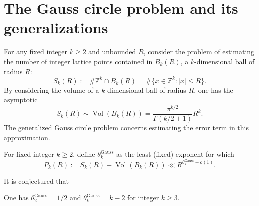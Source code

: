 \chapter{The Gauss circle problem and its generalizations}\label{gauss-circle-chapter}

\unintegrated

For any fixed integer $k \ge 2$ and unbounded $R$, consider the problem of estimating the number of integer lattice points contained in $B_k(R)$, a $k$-dimensional ball of radius $R$:
\[
S_k(R) := \# \mathbb{Z}^k \cap B_k(R) = \# \{x \in \mathbb{Z}^k: |x| \le R\}.
\]
By considering the volume of a $k$-dimensional ball of radius $R$, one has the asymptotic
\[
S_k(R) \sim \operatorname{Vol}(B_k(R)) = \frac{\pi^{k/2}}{\Gamma(k/2 + 1)}R^k.
\]
The generalized Gauss circle problem concerns estimating the error term in this approximation.

\begin{definition}
For fixed integer $k \ge 2$, define $\theta^{\operatorname{Gauss}}_{k}$ as the least (fixed) exponent for which
\[
P_k(R) := S_k(R) - \operatorname{Vol}(B_k(R)) \ll R^{\theta^{\operatorname{Gauss}}_{k} + o(1)}.
\]
\end{definition}

It is conjectured that 

\begin{conjecture}
One has $\theta^{\operatorname{Gauss}}_{2} = 1/2$ and $\theta^{\operatorname{Gauss}}_{k} = k - 2$ for integer $k \ge 3$.
\end{conjecture}